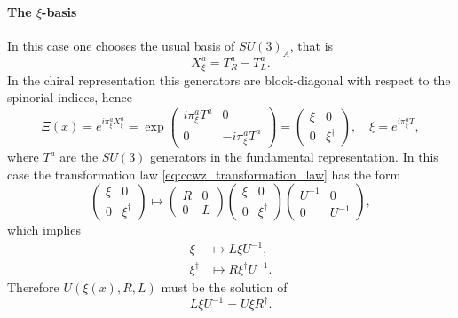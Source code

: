 \paragraph{The $\xi$-basis} In this case one chooses the usual basis of $SU(3)_A$, that is 
\begin{equation}
  X^a_\xi = T^a_R - T^a_L .
\end{equation}
In the chiral representation this generators are block-diagonal with respect to the spinorial indices, hence
\begin{equation}
  \Xi (x) = e^{i \pi^a_\xi X^a_\xi} = \exp{\begin{pmatrix} i \pi^a_\xi T^a & 0 \\ 0 & - i \pi^a_\xi T^a \end{pmatrix}} = \begin{pmatrix} \xi & 0 \\ 0 & \xi^\dagger \end{pmatrix} , \quad \xi = e^{i \pi^a_\xi T} ,
\end{equation}
where $T^a$ are the $SU(3)$ generators in the fundamental representation. In this case the transformation law \eqref{eq:ccwz_transformation_law} has the form
\begin{equation}
  \begin{pmatrix} \xi & 0 \\ 0 & \xi^\dagger \end{pmatrix} \mapsto
  \begin{pmatrix} R & 0 \\ 0 & L \end{pmatrix}
  \begin{pmatrix} \xi & 0 \\ 0 & \xi^\dagger \end{pmatrix} 
  \begin{pmatrix} U^{-1} & 0 \\ 0 & U^{-1} \end{pmatrix} ,
\end{equation}
which implies
\begin{subequations}
  \begin{align}
    \xi &\mapsto L \xi U^{-1} , \\
    \xi^\dagger &\mapsto R \xi^\dagger U^{-1} .
    \label{eq:xi_transformation_law}
  \end{align}
\end{subequations}
Therefore $U \left(\xi(x), R, L \right)$ must be the solution of
\begin{equation}
  L \xi U^{-1} = U \xi R^\dagger .
  \label{eq:xi-base_U_condition}
\end{equation}

